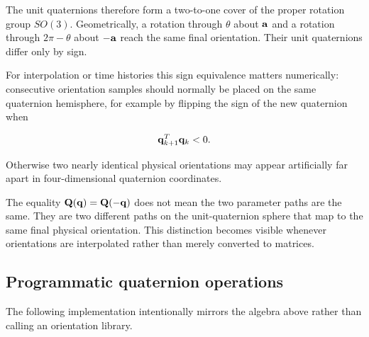 The unit quaternions therefore form a two-to-one cover of the proper rotation
group $SO(3)$. Geometrically, a rotation through $\theta$ about $\mathbf{a}$ and a
rotation through $2\pi-\theta$ about $-\mathbf{a}$ reach the same final orientation.
Their unit quaternions differ only by sign.

For interpolation or time histories this sign equivalence matters numerically:
consecutive orientation samples should normally be placed on the same quaternion
hemisphere, for example by flipping the sign of the new quaternion when

\begin{equation}
    \mathbf{q}_{k+1}^{T}\mathbf{q}_{k}<0.
\end{equation}

Otherwise two nearly identical physical orientations may appear artificially far
apart in four-dimensional quaternion coordinates.

\begin{notebooknote}
The equality $\mathbf{Q}(\mathbf{q})=\mathbf{Q}(-\mathbf{q})$ does not mean the two parameter paths are
the same. They are two different paths on the unit-quaternion sphere that map to
the same final physical orientation. This distinction becomes visible whenever
orientations are interpolated rather than merely converted to matrices.
\end{notebooknote}

\subsection{Programmatic quaternion operations}

The following implementation intentionally mirrors the algebra above rather than
calling an orientation library.

